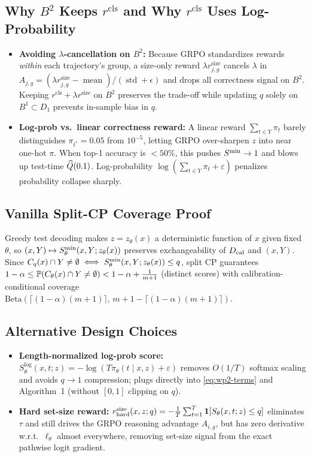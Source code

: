 \documentclass[10pt,a4paper]{article}
\begin{document}
\subsection{Why $B^2$ Keeps $r^{\mathrm{cls}}$ and Why $r^{\mathrm{cls}}$ Uses Log-Probability} \label{app:wp2-split}
\begin{itemize}
\item \textbf{Avoiding $\lambda$-cancellation on $B^2$:} Because GRPO standardizes rewards \emph{within} each trajectory's group, a size-only reward $\lambda r^{\mathrm{size}}_{j,g}$ cancels $\lambda$ in $A_{j,g}=(\lambda r^{\mathrm{size}}_{j,g}-\operatorname{mean})/(\operatorname{std}+\epsilon)$ and drops all correctness signal on $B^2$. Keeping $r^{\mathrm{cls}}+\lambda r^{\mathrm{size}}$ on $B^2$ preserves the trade-off while updating $q$ solely on $B^1\subset D_1$ prevents in-sample bias in $q$.
\item \textbf{Log-prob vs.\ linear correctness reward:} A linear reward $\sum_{t\in Y}\pi_t$ barely distinguishes $\pi_{t^*}=0.05$ from $10^{-5}$, letting GRPO over-sharpen $z$ into near one-hot $\pi$. When top-1 accuracy is $<50\%$, this pushes $S^{\min}\to 1$ and blows up test-time $\widehat Q(0.1)$. Log-probability $\log(\sum_{t\in Y}\pi_t+\varepsilon)$ penalizes probability collapse sharply.
\end{itemize}

\subsection{Vanilla Split-CP Coverage Proof} \label{app:cp-proof}
Greedy test decoding makes $z=z_\theta(x)$ a deterministic function of $x$ given fixed $\theta$, so $(x,Y)\mapsto S^{\min}_\theta(x,Y;z_\theta(x))$ preserves exchangeability of $D_{\mathrm{cal}}$ and $(x,Y)$. Since $C_q(x)\cap Y\neq\emptyset \iff S^{\min}_\theta(x,Y;z_\theta(x))\le q$, split CP guarantees $1-\alpha \le \mathbb{P}(C_\theta(x)\cap Y\neq\emptyset) < 1-\alpha+\frac{1}{m+1}$ (distinct scores) with calibration-conditional coverage $\mathrm{Beta}(\lceil(1-\alpha)(m+1)\rceil,\,m+1-\lceil(1-\alpha)(m+1)\rceil)$.

\subsection{Alternative Design Choices}
\begin{itemize}
\item \textbf{Length-normalized log-prob score:} $S_\theta^{\mathrm{log}}(x,t;z)=-\log(T\pi_\theta(t\mid x,z)+\varepsilon)$ removes $O(1/T)$ softmax scaling and avoids $q\to 1$ compression; plugs directly into \eqref{eq:wp2-terms} and Algorithm~1 (without $[0,1]$ clipping on $q$).
\item \textbf{Hard set-size reward:} $r^{\mathrm{size}}_{\mathrm{hard}}(x,z;q)=-\frac{1}{T}\sum_{t=1}^T \mathbf{1}[S_\theta(x,t;z)\le q]$ eliminates $\tau$ and still drives the GRPO reasoning advantage $A_{i,g}$, but has zero derivative w.r.t.\ $\ell_\theta$ almost everywhere, removing set-size signal from the exact pathwise logit gradient.
\end{itemize}
\end{document}
